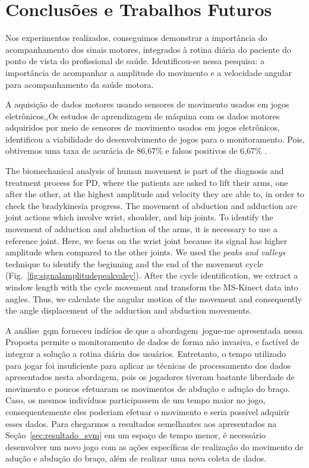 \chapter{Conclusões e Trabalhos Futuros}\label{chapter:conclusoes_futuros}
Nos experimentos realizados, conseguimos demonstrar a importância do acompanhamento dos sinais motores, integrados à rotina diária do paciente do ponto de vista do profissional de saúde. Identificou-se nessa pesquisa: a importância de acompanhar a amplitude do movimento e a velocidade angular para acompanhamento da saúde motora.

A aquisição de dados motores usando sensores de movimento usados em jogos eletrônicos,,Os estudos de aprendizagem de máquina com os dados motores adquiridos por meio de sensores de movimento usados em jogos eletrônicos, identificou a viabilidade do desenvolvimento de jogos para o monitoramento. Pois, obtivemos uma taxa de acurácia de 86,67\% e falsos positivos de 6,67\% .

The biomechanical analysis of human movement is part of the diagnosis and treatment process for PD, where the patients are asked to lift their arms, one after the other, at the highest amplitude and velocity they are able to, in order to check the bradykinesia progress. The movement of abduction and adduction are joint actions which involve wrist, shoulder, and hip joints. To identify the movement of adduction and abduction of the arms, it is necessary to use a reference joint. Here, we focus on the wrist joint because its signal has higher amplitude when compared to the other joints. We used the \textit{peaks and valleys} technique to identify the beginning and the end of the movement cycle (Fig.~\ref{fig:signalamplitudepeakvaley}). After the cycle identification, we extract a window length with the cycle movement and transform the MS-Kinect data into angles. Thus, we calculate the angular motion of the movement and consequently the angle displacement of the adduction and abduction movements.

A análise~\ac{gqm} forneceu indícios de que a abordagem~\ac{jogue-me} apresentada nessa Proposta permite o monitoramento de dados de forma não invasiva, e factível de integrar a solução a rotina diária dos usuários. Entretanto, o tempo utilizado para jogar foi insuficiente para aplicar as técnicas de processamento dos dados apresentados nesta abordagem, pois os jogadores tiveram bastante liberdade de movimento e poucos efetuaram os movimentos de abdução e adução do braço. Caso, os mesmos indivíduos participassem de um tempo maior no jogo, consequentemente eles poderiam efetuar o movimento e seria possível adquirir esses dados. Para chegarmos a resultados semelhantes aos apresentados na Seção~\ref{sec:resultado_svm} em um espaço de tempo menor, é necessário desenvolver um novo jogo com as ações específicas de realização do movimento de adução e abdução do braço, além de realizar uma nova coleta de dados.


